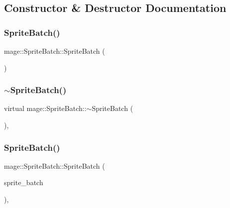 \subsection{Constructor \& Destructor Documentation}
\hypertarget{classmage_1_1_sprite_batch_a75924326627c792ff454d9d2a2ba1fda}{}\label{classmage_1_1_sprite_batch_a75924326627c792ff454d9d2a2ba1fda} 
\subsubsection{\texorpdfstring{Sprite\+Batch()}{SpriteBatch()}\hspace{0.1cm}{\footnotesize\ttfamily [1/3]}}
{\footnotesize\ttfamily mage\+::\+Sprite\+Batch\+::\+Sprite\+Batch (\begin{DoxyParamCaption}{ }\end{DoxyParamCaption})}

\hypertarget{classmage_1_1_sprite_batch_ab0e2b5af638de0a6a3bbcf2bba6c730a}{}\label{classmage_1_1_sprite_batch_ab0e2b5af638de0a6a3bbcf2bba6c730a} 
\subsubsection{\texorpdfstring{$\sim$\+Sprite\+Batch()}{~SpriteBatch()}}
{\footnotesize\ttfamily virtual mage\+::\+Sprite\+Batch\+::$\sim$\+Sprite\+Batch (\begin{DoxyParamCaption}{ }\end{DoxyParamCaption})\hspace{0.3cm}{\ttfamily [virtual]}, {\ttfamily [default]}}

\hypertarget{classmage_1_1_sprite_batch_a10fe1d6cf1d2de9e087b370e7d696be8}{}\label{classmage_1_1_sprite_batch_a10fe1d6cf1d2de9e087b370e7d696be8} 
\subsubsection{\texorpdfstring{Sprite\+Batch()}{SpriteBatch()}\hspace{0.1cm}{\footnotesize\ttfamily [2/3]}}
{\footnotesize\ttfamily mage\+::\+Sprite\+Batch\+::\+Sprite\+Batch (\begin{DoxyParamCaption}\item[{const \hyperlink{classmage_1_1_sprite_batch}{Sprite\+Batch} \&}]{sprite\+\_\+batch }\end{DoxyParamCaption})\hspace{0.3cm}{\ttfamily [private]}, {\ttfamily [delete]}}

